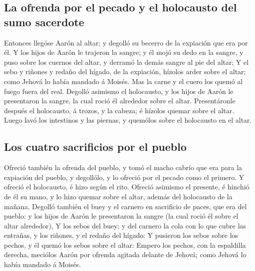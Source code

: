 \hypertarget{la-ofrenda-por-el-pecado-y-el-holocausto-del-sumo-sacerdote}{%
\subsection{La ofrenda por el pecado y el holocausto del sumo
sacerdote}\label{la-ofrenda-por-el-pecado-y-el-holocausto-del-sumo-sacerdote}}

 Entonces llegóse Aarón al altar; y degolló su becerro de
la expiación que era por él.  Y los hijos de Aarón le
trajeron la sangre; y él mojó su dedo en la sangre, y puso sobre los
cuernos del altar, y derramó la demás sangre al pie del altar;
 Y el sebo y riñones y redaño del hígado, de la
expiación, hízolos arder sobre el altar; como Jehová lo había mandado á
Moisés.  Mas la carne y el cuero los quemó al fuego fuera
del real.  Degolló asimismo el holocausto, y los hijos de
Aarón le presentaron la sangre, la cual roció él alrededor sobre el
altar.  Presentáronle después el holocausto, á trozos, y
la cabeza; é hízolos quemar sobre el altar.  Luego lavó
los intestinos y las piernas, y quemólos sobre el holocausto en el
altar.

\hypertarget{los-cuatro-sacrificios-por-el-pueblo}{%
\subsection{Los cuatro sacrificios por el
pueblo}\label{los-cuatro-sacrificios-por-el-pueblo}}

 Ofreció también la ofrenda del pueblo, y tomó el macho
cabrío que era para la expiación del pueblo, y degollólo, y lo ofreció
por el pecado como el primero.  Y ofreció el holocausto,
é hizo según el rito.  Ofreció asimismo el presente, é
hinchió de él su mano, y lo hizo quemar sobre el altar, además del
holocausto de la mañana.  Degolló también el buey y el
carnero en sacrificio de paces, que era del pueblo: y los hijos de Aarón
le presentaron la sangre (la cual roció él sobre el altar alrededor),
 Y los sebos del buey; y del carnero la cola con lo que
cubre las entrañas, y los riñones, y el redaño del hígado:
 Y pusieron los sebos sobre los pechos, y él quemó los
sebos sobre el altar:  Empero los pechos, con la
espaldilla derecha, meciólos Aarón por ofrenda agitada delante de
Jehová; como Jehová lo había mandado á Moisés.

